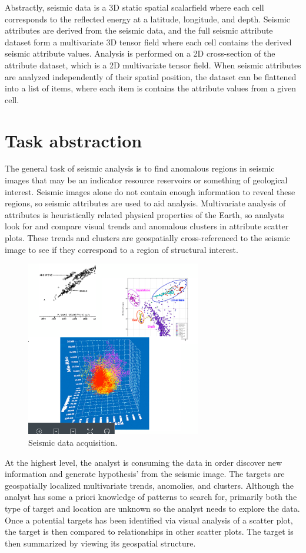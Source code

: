 \documentclass[journal]{vgtc}                %
\begin{document}
Abstractly, seismic data is a 3D static spatial scalarfield where each cell corresponds to the reflected energy at a latitude, longitude, and depth. 
Seismic attributes are derived from the seismic data, and the full seismic attribute dataset form a multivariate 3D tensor 
field where each cell contains the derived seismic attribute values. Analysis is performed on a 2D cross-section of the attribute dataset,
which is a 2D multivariate tensor field. When seismic attributes are analyzed independently of their spatial position, the dataset can be
flattened into a list of items, where each item is contains the attribute values from a given cell.


\section{Task abstraction}
The general task of seismic analysis is to find anomalous regions in seismic images
that may be an indicator resource reservoirs or something of geological interest.
Seismic images alone do not contain enough information to reveal these regions, so
seismic attributes are used to aid analysis. Multivariate analysis of attributes is 
heuristically related physical properties of the Earth, so analysts look for and compare
visual trends and anomalous clusters in attribute scatter plots. These trends and clusters
are geospatially cross-referenced to the seismic image to see if
they correspond to a region of structural interest.

\begin{figure}[htb]
\centering
\includegraphics[width=3in]{attr_anal}
\caption{Seismic data acquisition.}
\label{seismic_acq}
\end{figure}

At the highest level, the analyst is consuming the data in order discover new information
and generate  hypothesis' from the seismic image. The targets are geospatially localized multivariate trends, anomolies, and clusters. 
Although the analyst has some a priori knowledge of patterns to search for, primarily both the type of target and location are unknown
so the analyst needs to explore the data. Once a potential targets has been identified via visual analysis of a scatter plot, the target 
is then compared to relationships in other scatter plots. The target is then summarized by viewing its geospatial structure. 
\end{document}
